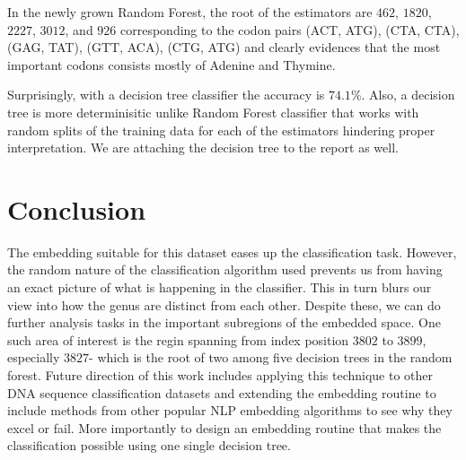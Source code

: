 \documentclass[oneside, twocolumn, a4paper, 10pt]{IEEEtran}
\begin{document}
\par
In the newly grown Random Forest, the root of the estimators are $462$, $1820$, $2227$, $3012$, and $926$ corresponding to the codon pairs (ACT, ATG), (CTA, CTA), (GAG, TAT), (GTT, ACA), (CTG, ATG) and clearly evidences that the most important codons consists mostly of Adenine and Thymine.\\
\par 
Surprisingly, with a decision tree classifier the accuracy is $74.1$\%. Also, a decision tree is more determinisitic unlike Random Forest classifier that works with random splits of the training data for each of the estimators hindering proper interpretation. We are attaching the decision tree to the report as well.
\section{Conclusion}
The embedding suitable for this dataset eases up the classification task. However, the random nature of the classification algorithm used prevents us from having an exact picture of what is happening in the classifier. This in turn blurs our view into how the genus are distinct from each other. Despite these, we can do further analysis tasks in the important subregions of the embedded space. One such area of interest is the regin spanning from index position $3802$ to $3899$, especially $3827$- which is the root of two among five decision trees in the random forest. Future direction of this work includes applying this technique to other DNA sequence classification datasets and extending the embedding routine to include methods from other popular NLP embedding algorithms to see why they excel or fail. More importantly to design an embedding routine that makes the classification possible using one single decision tree.
%
\end{document}
